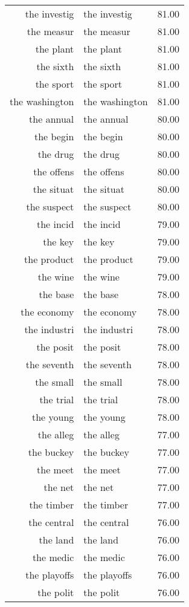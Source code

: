 \begin{table}[ht]
\begin{tabular}{rlr}
  the investig & the investig & 81.00 \\ 
  the measur & the measur & 81.00 \\ 
  the plant & the plant & 81.00 \\ 
  the sixth & the sixth & 81.00 \\ 
  the sport & the sport & 81.00 \\ 
  the washington & the washington & 81.00 \\ 
  the annual & the annual & 80.00 \\ 
  the begin & the begin & 80.00 \\ 
  the drug & the drug & 80.00 \\ 
  the offens & the offens & 80.00 \\ 
  the situat & the situat & 80.00 \\ 
  the suspect & the suspect & 80.00 \\ 
  the incid & the incid & 79.00 \\ 
  the key & the key & 79.00 \\ 
  the product & the product & 79.00 \\ 
  the wine & the wine & 79.00 \\ 
  the base & the base & 78.00 \\ 
  the economy & the economy & 78.00 \\ 
  the industri & the industri & 78.00 \\ 
  the posit & the posit & 78.00 \\ 
  the seventh & the seventh & 78.00 \\ 
  the small & the small & 78.00 \\ 
  the trial & the trial & 78.00 \\ 
  the young & the young & 78.00 \\ 
  the alleg & the alleg & 77.00 \\ 
  the buckey & the buckey & 77.00 \\ 
  the meet & the meet & 77.00 \\ 
  the net & the net & 77.00 \\ 
  the timber & the timber & 77.00 \\ 
  the central & the central & 76.00 \\ 
  the land & the land & 76.00 \\ 
  the medic & the medic & 76.00 \\ 
  the playoffs & the playoffs & 76.00 \\ 
  the polit & the polit & 76.00 \\ 

\end{tabular}
\end{table}
